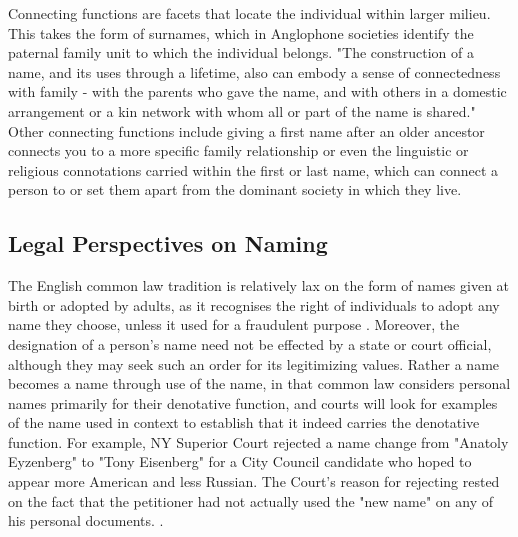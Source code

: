 Connecting functions are facets that locate the individual within larger
milieu.  This takes the form of surnames, which in Anglophone societies
identify the paternal family unit to which the individual belongs. "The
construction of a name, and its uses through a lifetime, also can embody a
sense of connectedness with family - with the parents who gave the name, and
with others in a domestic arrangement or a kin network with whom all or part of
the name is shared." \parencite[711]{finch08} Other connecting functions
include giving a first name after an older ancestor connects you to a more
specific family relationship or even the linguistic or religious connotations
carried within the first or last name, which can connect a person to or set
them apart from the dominant society in which they live.

\subsection{Legal Perspectives on Naming}

The English common law tradition is relatively lax on the form of names given
at birth or adopted by adults, as it recognises the right of individuals to
adopt any name they choose, unless it used for a fraudulent purpose
\parencite[403]{heymann11}. Moreover, the designation of a person's name need
not be effected by a state or court official, although they may seek such an
order for its legitimizing values. Rather a name becomes a name through use of
the name, in that common law considers personal names primarily for their
denotative function, and courts will look for examples of the name used in
context to establish that it indeed carries the denotative function. For
example, NY Superior Court rejected a name change from "Anatoly Eyzenberg" to
"Tony Eisenberg" for a City Council candidate who hoped to appear more American
and less Russian. The Court's reason for rejecting rested on the fact that the
petitioner had not actually used the "new name" on any of his personal
documents. \parencite{eisenberg03} \parencite[404]{heymann11}.


